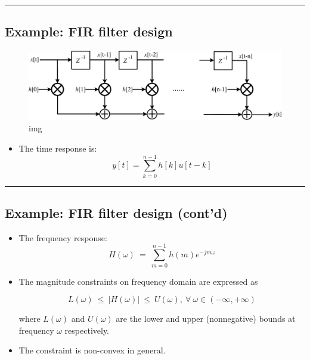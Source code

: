 \documentclass[]{article}
\providecommand{\tightlist}{%
  \setlength{\itemsep}{0pt}\setlength{\parskip}{0pt}}
\begin{document}
\begin{center}\rule{0.5\linewidth}{\linethickness}\end{center}

\hypertarget{example-fir-filter-design}{%
\subsection{Example: FIR filter
design}\label{example-fir-filter-design}}

\begin{figure}
\centering
\includegraphics{ellipsoid.files/fir_strctr.pdf}
\caption{img}
\end{figure}

\begin{itemize}
\tightlist
\item
  The time response is: \[y[t] = \sum_{k=0}^{n-1}{h[k]u[t-k]}\]
\end{itemize}

\begin{center}\rule{0.5\linewidth}{\linethickness}\end{center}

\hypertarget{example-fir-filter-design-contd}{%
\subsection{Example: FIR filter design
(cont'd)}\label{example-fir-filter-design-contd}}

\begin{itemize}
\item
  The frequency response:
  \[H(\omega)~=~\sum_{m=0}^{n-1}{h(m)e^{-jm\omega}}\]
\item
  The magnitude constraints on frequency domain are expressed as

  \[L(\omega)~\leq~|H(\omega)|~\leq~U(\omega),~\forall~\omega\in(-\infty,+\infty)\]

  where \(L(\omega)\) and \(U(\omega)\) are the lower and upper
  (nonnegative) bounds at frequency \(\omega\) respectively.
\item
  The constraint is non-convex in general.
\end{itemize}
\end{document}
